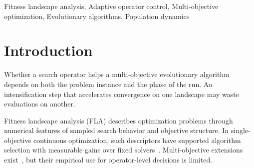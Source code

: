 \documentclass[conference]{IEEEtran}
\begin{document}
\begin{abstract}
Adaptive operator control often relies on reward signals accumulated
during the run, yet for some operators a single keep-or-drop decision
after a short warmup may suffice. We investigate whether static
fitness-landscape features or early population dynamics better inform
such a decision for an IVF-inspired intensification operator inside
SPEA2. On 51 continuous multi-objective benchmark instances, a
14-feature landscape feature set provides a moderate signal for ranking
expected IGD gain (Random Forest leave-one-out $r_s = 0.374$), but
binary classification does not generalize reliably across benchmark families.
In contrast, mean archive turnover during the first 20\% of generations
yields a stronger switching signal ($q_{\mathrm{BH}} = 0.013$,
$\hat{A}_{12} = 0.849$); a single-threshold rule achieves balanced
accuracy $0.754$ under leave-one-family-out cross-validation. A
warmup-based controller using this signal incurs no hypervolume
losses relative to always-on IVF-SPEA2 on the 10 IGD-labeled
\textsc{Not helpful} instances, while recording 34 wins against
baseline SPEA2 overall, at the cost of forfeiting gains on
9 \textsc{Helpful} cases concentrated in WFG.
Our results suggest that, for this operator--host pair, static
features serve as priors on gain magnitude whereas early dynamics are
more actionable for binary switching.
\end{abstract}

\begin{IEEEkeywords}
Fitness landscape analysis, Adaptive operator control,
Multi-objective optimization, Evolutionary algorithms, Population dynamics
\end{IEEEkeywords}

\section{Introduction}
\label{sec:intro}

Whether a search operator helps a multi-objective evolutionary algorithm
depends on both the problem instance and the phase of the run. An
intensification step that accelerates convergence on one landscape may waste
evaluations on another.

Fitness landscape analysis (FLA) describes optimization problems through
numerical features of sampled search behavior and objective structure. In
single-objective continuous optimization, such descriptors have supported
algorithm selection with measurable gains over fixed
solvers~\cite{mersmann2011exploratory,kerschke2019automated,bischl2016aslib}.
Multi-objective extensions exist~\cite{liefooghe2018landscape}, but their
empirical use for operator-level decisions is limited.
\end{document}
